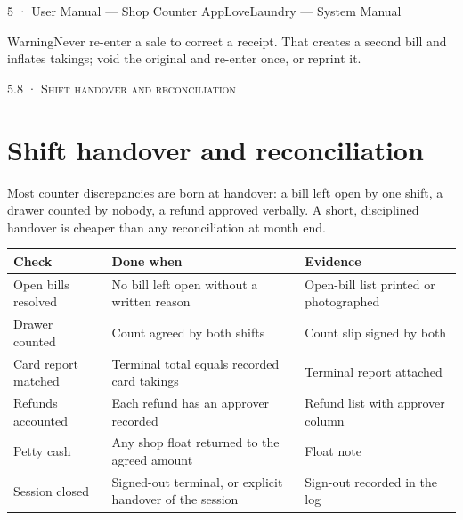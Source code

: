 \documentclass[11pt,a4paper,oneside]{book}
\begin{document}
5 · User Manual — Shop Counter AppLoveLaundry — System Manual

\begin{notebox}WarningNever re-enter a sale to correct a receipt. That creates a second bill and inflates takings; void the original and re-enter once, or reprint it.\end{notebox}
\textsc{\small\color{crimson}5.8 · Shift handover and reconciliation}\par\medskip
\section*{Shift handover and reconciliation}
Most counter discrepancies are born at handover: a bill left open by one shift, a drawer counted by nobody, a refund approved verbally. A short, disciplined handover is cheaper than any reconciliation at month end.

\begin{center}\small
\begin{tabularx}{\linewidth}{|X|X|X|}
\hline
\rowcolor{lightgrey}
\textbf{Check} & \textbf{Done when} & \textbf{Evidence} \\ \hline
Open bills resolved & No bill left open without a written reason & Open-bill list printed or photographed \\ \hline
Drawer counted & Count agreed by both shifts & Count slip signed by both \\ \hline
Card report matched & Terminal total equals recorded card takings & Terminal report attached \\ \hline
Refunds accounted & Each refund has an approver recorded & Refund list with approver column \\ \hline
Petty cash & Any shop float returned to the agreed amount & Float note \\ \hline
Session closed & Signed-out terminal, or explicit handover of the session & Sign-out recorded in the log \\ \hline
\end{tabularx}
\end{center}
\end{document}
